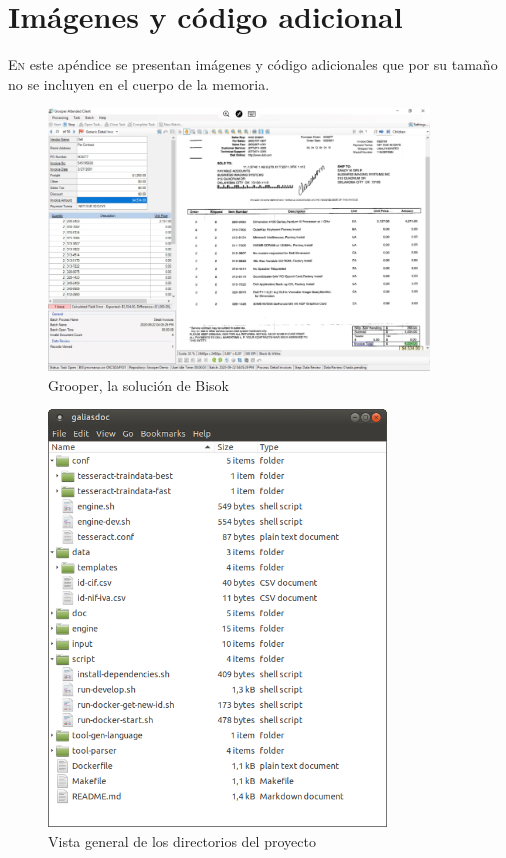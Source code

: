 
\chapter{Imágenes y código adicional}
\label{chap:adicional-1}

\lettrine{E}{n} este apéndice se presentan imágenes y código adicionales que por su tamaño no se incluyen en el cuerpo de la memoria.


\begin{figure}[hp!]
    \centering
    \includegraphics[width=0.9\textwidth]{imaxes/b-estado-arte/bisok-grooper}
    \caption{Grooper, la solución de Bisok}
    \label{fig:grooper-bisok}
\end{figure}

\begin{figure}[hp!]
    \centering
    \includegraphics[width=0.8\textwidth]{imaxes/z-adicional/estructura-general.png}
    \caption{Vista general de los directorios del proyecto}
    \label{fig:directorios-proyecto}
\end{figure}

